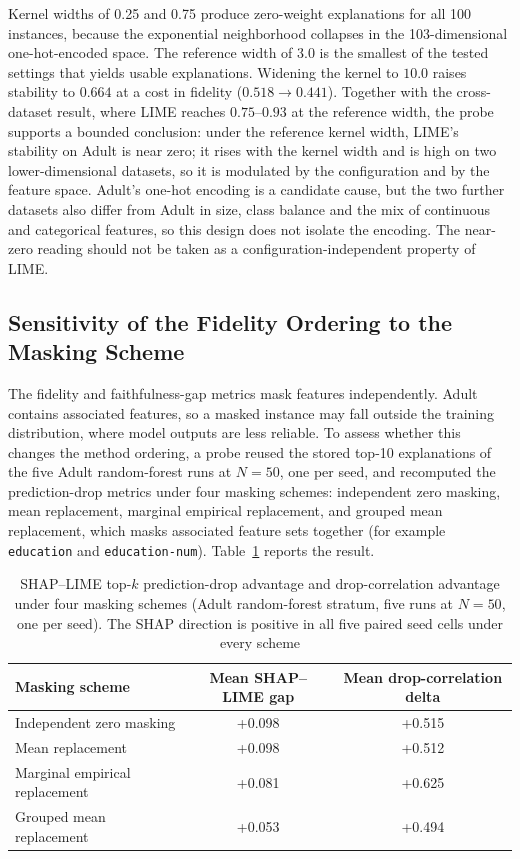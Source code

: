 \documentclass{cleiej}
\begin{document}
Kernel widths of 0.25 and 0.75 produce zero-weight explanations for all 100
instances, because the exponential neighborhood collapses in the
103-dimensional one-hot-encoded space. The reference width of 3.0 is the
smallest of the tested settings that yields usable explanations. Widening
the kernel to $10.0$ raises stability to $0.664$ at a cost in fidelity
($0.518 \rightarrow 0.441$). Together with the cross-dataset result, where
LIME reaches $0.75$--$0.93$ at the reference width, the probe supports a
bounded conclusion: under the reference kernel width, LIME's stability on
Adult is near zero; it rises with the kernel width and is high on two
lower-dimensional datasets, so it is modulated by the configuration and by
the feature space. Adult's one-hot encoding is a candidate cause, but the
two further datasets also differ from Adult in size, class balance and the
mix of continuous and categorical features, so this design does not isolate
the encoding. The near-zero reading should not be taken as a
configuration-independent property of LIME.

\subsection{Sensitivity of the Fidelity Ordering to the Masking Scheme}
\label{sec:masking}

The fidelity and faithfulness-gap metrics mask features independently.
Adult contains associated features, so a masked instance may fall outside
the training distribution, where model outputs are less reliable. To assess
whether this changes the method ordering, a probe reused the stored top-10
explanations of the five Adult random-forest runs at $N=50$, one per seed,
and recomputed the prediction-drop metrics under four masking schemes:
independent zero masking, mean replacement, marginal empirical replacement,
and grouped mean replacement, which masks associated feature sets together
(for example \texttt{education} and \texttt{education-num}).
Table~\ref{tab:masking} reports the result.

\begin{table}[htb]
\centering
\caption{SHAP--LIME top-$k$ prediction-drop advantage and drop-correlation
advantage under four masking schemes (Adult random-forest stratum, five
runs at $N=50$, one per seed). The SHAP direction is positive in all five
paired seed cells under every scheme}
\label{tab:masking}
\begin{tabular}{lcc}
\toprule
Masking scheme & Mean SHAP--LIME gap & Mean drop-correlation delta \\
\midrule
Independent zero masking      & +0.098 & +0.515 \\
Mean replacement               & +0.098 & +0.512 \\
Marginal empirical replacement & +0.081 & +0.625 \\
Grouped mean replacement       & +0.053 & +0.494 \\
\bottomrule
\end{tabular}
\end{table}
\end{document}
